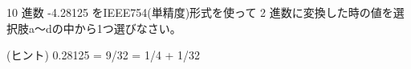 10 進数 -4.28125 をIEEE754(単精度)形式を使って 2 進数に変換した時の値を選択肢a〜dの中から1つ選びなさい。

\medskip
\noindent (ヒント) 0.28125 = 9/32 = 1/4 + 1/32
